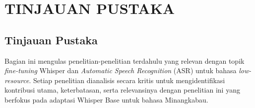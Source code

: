 \newpage
\chapter{TINJAUAN PUSTAKA} \label{Bab II}

\section{Tinjauan Pustaka} \label{II.Tinjauan}

Bagian ini mengulas penelitian-penelitian terdahulu yang relevan dengan topik \textit{fine-tuning} Whisper dan \textit{Automatic Speech Recognition} (ASR) untuk bahasa \textit{low-resource}. Setiap penelitian dianalisis secara kritis untuk mengidentifikasi kontribusi utama, keterbatasan, serta relevansinya dengan penelitian ini yang berfokus pada adaptasi Whisper Base untuk bahasa Minangkabau.


